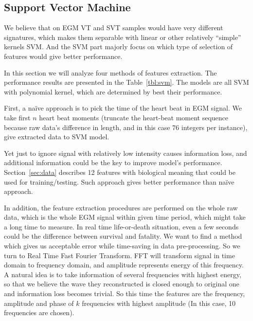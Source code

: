 \subsection{Support Vector Machine}
\label{sec:svm}

We believe that on EGM VT and SVT samples would have very different 
signatures, which makes them separable with linear or other 
relatively “simple” kernels SVM. And the SVM part majorly focus on 
which type of selection of features would give better performance. 

In this section we will analyze four methods of features extraction. 
The performance results are presented in the Table~\ref{tbl:svm}. The 
models are all SVM with polynomial kernel, which are determined by 
best their performance. 

First, a na\"ive approach is to pick the time of the heart beat in 
EGM signal. We take first $n$ 
heart beat moments (truncate the heart-beat moment sequence because 
raw data’s difference in length, and in this case 76 integers per 
instance), give extracted data to SVM model. 

Yet just to ignore signal with relatively low intensity causes 
information loss, and additional information could be the key to 
improve model's performance. Section~\ref{sec:data} describes 12 
features with biological meaning that could be used for 
training/testing. Such approach gives better performance than na\"ive 
approach.

In addition, the feature extraction procedures are performed on the 
whole raw data, which is the whole EGM signal within given time 
period, which might take a long time to measure. In real time 
life-or-death situation, even a few seconds could be the difference 
between survival and fatality. We want to find a method which gives 
us acceptable error while time-saving in data pre-processing. So we 
turn to Real Time Fast Fourier Transform. FFT will transform signal 
in time domain to frequency domain, and amplitude represents energy 
of this frequency. A natural idea is to take information of several 
frequencies with highest energy, so that we believe the wave they 
reconstructed is closed enough to original one and information loss 
becomes trivial. So this time the features are the frequency, 
amplitude and phase of $k$ frequencies with highest amplitude (In 
this case, 10 frequencies are chosen). 

